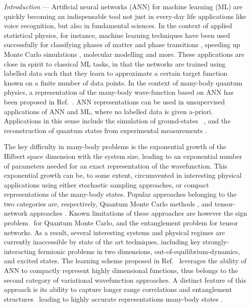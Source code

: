 \documentclass[aps,prl,twocolumn,amsmath,amssymb,superscriptaddress,floatfix]{revtex4-1}
\begin{document}
\textit{Introduction} ---
Artificial neural networks (ANN) for machine learning (ML) are quickly becoming an indispensable tool not just in every-day life applications like voice recognition, but also in fundamental sciences. In the context of applied statistical physics, for instance, machine learning techniques have been used successfully for classifying phases of matter and phase transitions \cite{Nieuwenburg2017,Carrasquilla2017,Schindler2017,YoshiokaML2018,KaubrueggerBudich2018,KimML2018}, speeding up Monte Carlo simulations \cite{ShenLiuFu2018,HuangWangMC2017}, molecular modelling \cite{RuppAlexandreML2012,de_comparing_2016} and more. These applications are close in spirit to classical ML tasks, in that the networks are trained using labelled data such that they learn to approximate a certain target function known on a finite number of data points. 
In the context of many-body quantum physics, a representation of the many-body wave-function based on ANN has been proposed in Ref.~\cite{Carleo2017}. ANN representations can be used in unsupervised applications of ANN and ML, where no labelled data is given a-priori. Applications in this sense include the simulation of ground-states ~\cite{Carleo2017,Saito2017,NomuraMasatoshi2017,GlasserCiracNN2018,DengLiDasSarma2017,SaitoKato2018,carleo_constructing_2018}, and the reconstruction of quantum states from experimental measurements \cite{TorlaiCarleoTomo2018, rocchetto_learning_2018}.

The key difficulty in many-body problems is the exponential growth of the Hilbert space dimension with the system size, leading to an exponential number of parameters needed for an exact representation of the wavefunction. This exponential growth can be, to some extent, circumvented in interesting physical applications using either stochastic sampling approaches, or compact representations of the many-body states. Popular approaches belonging to the two categories are, respectively, Quantum Monte Carlo methods \cite{ceperley_quantum_1986,becca_quantum_2017}, and tensor-network approaches \cite{White2005,Verstraete2008}. Known limitations of these approaches are however the sign problem~\cite{Troyer2005} for Quantum Monte Carlo, and the entanglement problem for tensor networks. As a result, several interesting systems and physical regimes are currently inaccessible by state of the art techniques, including key strongly-interacting fermionic problems in two dimensions, out-of-equilibrium-dynamics, and excited states. 
The learning scheme proposed in Ref.~ leverages the ability of ANN to compactly represent highly dimensional functions, thus belongs to the second category of variational wavefunction approaches. A distinct feature of this approach is its ability to capture longer range correlations and entanglement structures~\cite{DengLiDasSarma2017} leading to highly accurate representations many-body states \cite{Carleo2017,TorlaiCarleoTomo2018,NomuraMasatoshi2017,ChiralTopoNN2018,CaiLiu2018,GlasserCiracNN2018}.
\end{document}
